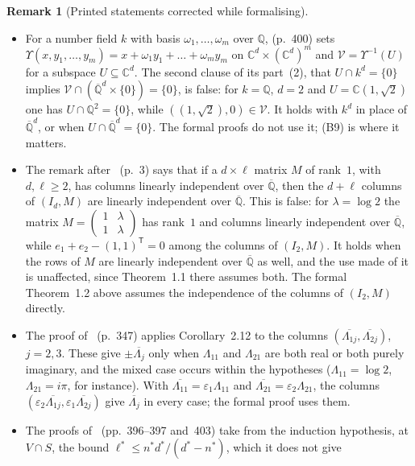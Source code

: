 \documentclass[11pt,a4paper]{article}
\theoremstyle{plain}
\theoremstyle{definition}
\newtheorem{remark}[theorem]{Remark}
\newcommand{\C}{\mathbb{C}}
\newcommand{\Q}{\mathbb{Q}}
\newcommand{\Alg}{\overline{\mathbb{Q}}}
\begin{document}
\begin{remark}[Printed statements corrected while formalising]
\begin{itemize}
\item[(A4)] For a number field $k$ with basis $\omega_{1},\dots,\omega_{m}$ over $\Q$,
\cite[Lemma~11.18]{waldschmidt-book} (p.~400) sets $\Upsilon(x,y_{1},\dots,y_{m})=x+\omega_{1}y_{1}+\dots+\omega_{m}y_{m}$
on $\C^{d}\times(\C^{d})^{m}$ and $\mathcal{V}=\Upsilon^{-1}(U)$ for a subspace $U\subseteq\C^{d}$. The second
clause of its part~(2), that $U\cap k^{d}=\{0\}$ implies $\mathcal{V}\cap(\Alg^{d}\times\{0\})=\{0\}$, is false: for
$k=\Q$, $d=2$ and $U=\C(1,\sqrt{2})$ one has $U\cap\Q^{2}=\{0\}$, while $((1,\sqrt{2}),0)\in\mathcal{V}$. It holds with
$k^{d}$ in place of $\Alg^{d}$, or when $U\cap\Alg^{d}=\{0\}$. The formal proofs do not use it; (B9) is where it
matters.
\item[(A5)] The remark after~\cite[Theorem~1.2]{waldschmidt-2005b} (p.~3) says that if a $d\times\ell$ matrix $M$ of
rank~$1$, with $d,\ell\geq2$, has columns linearly independent over $\Alg$, then the $d+\ell$ columns of $(I_{d},M)$
are linearly independent over $\Alg$. This is false: for $\lambda=\log2$ the matrix
$M=\left(\begin{smallmatrix}1&\lambda\\1&\lambda\end{smallmatrix}\right)$ has rank~$1$ and columns linearly
independent over $\Alg$, while $e_{1}+e_{2}-(1,1)^{\mathsf{T}}=0$ among the columns of $(I_{2},M)$. It holds when
the rows of $M$ are linearly independent over $\Alg$ as well, and the use made of it is unaffected, since Theorem~1.1
there assumes both. The formal Theorem~1.2 above assumes the independence of the columns of $(I_{2},M)$ directly.
\item[(B1)] The proof of~\cite[Corollary~2.13]{waldschmidt-2005a} (p.~347) applies Corollary~2.12 to the
columns $(\overline{\Lambda_{1j}},\overline{\Lambda_{2j}})$, $j=2,3$. These give $\pm\overline{\Lambda_{j}}$ only
when $\Lambda_{11}$ and $\Lambda_{21}$ are both real or both purely imaginary, and the mixed case occurs within the
hypotheses ($\Lambda_{11}=\log2$, $\Lambda_{21}=i\pi$, for instance). With $\overline{\Lambda_{11}}=\varepsilon_{1}
\Lambda_{11}$ and $\overline{\Lambda_{21}}=\varepsilon_{2}\Lambda_{21}$, the columns
$(\varepsilon_{2}\overline{\Lambda_{1j}},\varepsilon_{1}\overline{\Lambda_{2j}})$ give $\overline{\Lambda_{j}}$ in
every case; the formal proof uses them.
\item[(B2)] The proofs of~\cite[Corollaries~11.10 and~11.15]{waldschmidt-book} (pp.~396--397 and~403) take from
the induction hypothesis, at $V\cap S$, the bound $\ell^{*}\leq n^{*}d^{*}/(d^{*}-n^{*})$, which it does not give

\end{itemize}
\end{remark}
\end{document}
